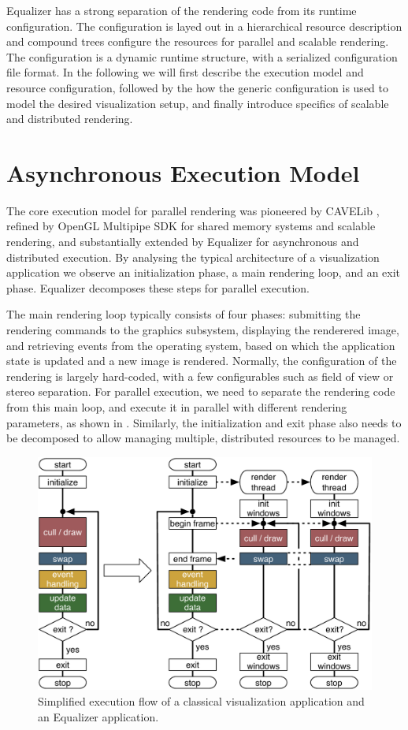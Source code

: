 Equalizer has a strong separation of the rendering code from its runtime
configuration. The configuration is layed out in a hierarchical resource
description and compound trees configure the resources for parallel and
scalable rendering. The configuration is a dynamic runtime structure, with a
serialized configuration file format. In the following we will first describe
the execution model and resource configuration, followed by the how the generic
configuration is used to model the desired visualization setup, and finally
introduce specifics of scalable and distributed rendering.

\section{Asynchronous Execution Model}

The core execution model for parallel rendering was pioneered by CAVELib
\cite{DACNCCGHPSNS:97}, refined by OpenGL Multipipe SDK for shared memory
systems and scalable rendering, and substantially extended by Equalizer for
asynchronous and distributed execution. By analysing the typical architecture of
a visualization application we observe an initialization phase, a main rendering
loop, and an exit phase. Equalizer decomposes these steps for parallel
execution.

The main rendering loop typically consists of four phases: submitting the
rendering commands to the graphics subsystem, displaying the renderered image,
and retrieving events from the operating system, based on which the application
state is updated and a new image is rendered. Normally, the configuration of
the rendering is largely hard-coded, with a few configurables such as field of
view or stereo separation. For parallel execution, we need to separate the
rendering code from this main loop, and execute it in parallel with different
rendering parameters, as shown in . Similarly, the
initialization and exit phase also needs to be decomposed to allow managing
multiple, distributed resources to be managed.

\begin{figure}[ht]\center
 \includegraphics[width=.9\columnwidth]{images/executionFlow}
 \caption{Simplified execution flow of a classical visualization application
  and an Equalizer application.}
 \label{FIG_execution}
\end{figure}

